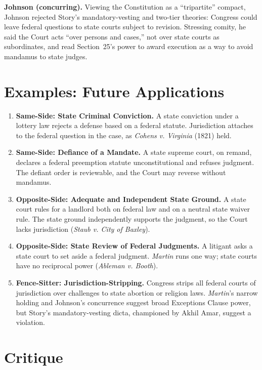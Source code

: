\documentclass[12pt]{article}
\begin{document}
\textbf{Johnson (concurring).} Viewing the Constitution as a ``tripartite'' compact, Johnson rejected Story's mandatory-vesting and two-tier theories: Congress could leave federal questions to state courts subject to revision. Stressing comity, he said the Court acts ``over persons and cases,'' not over state courts as subordinates, and read Section~25's power to award execution as a way to avoid mandamus to state judges.

\section{Examples: Future Applications}

\begin{enumerate}
\item \textbf{Same-Side: State Criminal Conviction.} A state conviction under a lottery law rejects a defense based on a federal statute. Jurisdiction attaches to the federal question in the case, as \textit{Cohens v. Virginia} (1821) held.
\item \textbf{Same-Side: Defiance of a Mandate.} A state supreme court, on remand, declares a federal preemption statute unconstitutional and refuses judgment. The defiant order is reviewable, and the Court may reverse without mandamus.
\item \textbf{Opposite-Side: Adequate and Independent State Ground.} A state court rules for a landlord both on federal law and on a neutral state waiver rule. The state ground independently supports the judgment, so the Court lacks jurisdiction (\textit{Staub v. City of Baxley}).
\item \textbf{Opposite-Side: State Review of Federal Judgments.} A litigant asks a state court to set aside a federal judgment. \textit{Martin} runs one way; state courts have no reciprocal power (\textit{Ableman v. Booth}).
\item \textbf{Fence-Sitter: Jurisdiction-Stripping.} Congress strips all federal courts of jurisdiction over challenges to state abortion or religion laws. \textit{Martin}'s narrow holding and Johnson's concurrence suggest broad Exceptions Clause power, but Story's mandatory-vesting dicta, championed by Akhil Amar, suggest a violation.
\end{enumerate}

\section{Critique}
\end{document}
